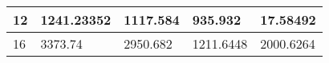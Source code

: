 \begin{table}[]
\begin{tabular}{|l|l|l|l|l|}
12                                                            & 1241.23352                                                                                          & 1117.584                                                                                        & 935.932                                                                                                     & 17.58492                                                                                         \\ \hline
16                                                            & 3373.74                                                                                             & 2950.682                                                                                        & 1211.6448                                                                                                   & 2000.6264                                                                                        \\ \hline
\end{tabular}
\end{table}


